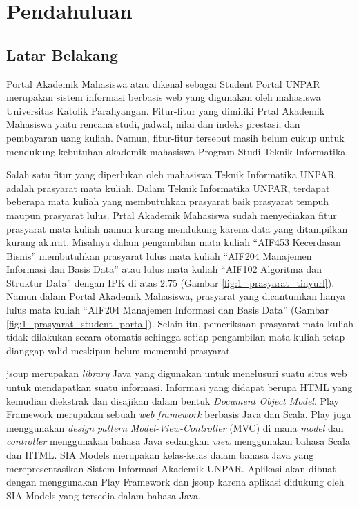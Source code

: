 \chapter{Pendahuluan}
\label{chap:pendahuluan}

\section{Latar Belakang}
\label{sec:latar_belakang}

Portal Akademik Mahasiswa atau dikenal sebagai Student Portal UNPAR\cite{studentportalunpar} merupakan sistem informasi berbasis web yang digunakan oleh mahasiswa Universitas Katolik Parahyangan. Fitur-fitur yang dimiliki Prtal Akademik Mahasiswa yaitu rencana studi, jadwal, nilai dan indeks prestasi, dan pembayaran uang kuliah. Namun, fitur-fitur tersebut masih belum cukup untuk mendukung kebutuhan akademik mahasiswa Program Studi Teknik Informatika. 

Salah satu fitur yang diperlukan oleh mahasiswa Teknik Informatika UNPAR adalah prasyarat mata kuliah. Dalam Teknik Informatika UNPAR, terdapat beberapa mata kuliah yang membutuhkan prasyarat baik prasyarat tempuh maupun prasyarat lulus. Prtal Akademik Mahasiswa sudah menyediakan fitur prasyarat mata kuliah namun kurang mendukung karena data yang ditampilkan kurang akurat. Misalnya dalam pengambilan mata kuliah ``AIF453 Kecerdasan Bisnis'' membutuhkan prasyarat lulus mata kuliah ``AIF204 Manajemen Informasi dan Basis Data'' atau lulus mata kuliah ``AIF102 Algoritma dan Struktur Data'' dengan IPK di atas 2.75 (Gambar \ref{fig:1_prasyarat_tinyurl}). Namun dalam Portal Akademik Mahasiswa, prasyarat yang dicantumkan hanya lulus mata kuliah ``AIF204 Manajemen Informasi dan Basis Data'' (Gambar \ref{fig:1_prasyarat_student_portal}). Selain itu, pemeriksaan prasyarat mata kuliah tidak dilakukan secara otomatis sehingga setiap pengambilan mata kuliah tetap dianggap valid meskipun belum memenuhi prasyarat.

jsoup\cite{jsoup} merupakan \textit{library} Java yang digunakan untuk menelusuri suatu situs web untuk mendapatkan suatu informasi. Informasi yang didapat berupa HTML yang kemudian diekstrak dan disajikan dalam bentuk \textit{Document Object Model}. Play Framework\cite{Leroux:2014} merupakan sebuah \textit{web framework} berbasis Java dan Scala. Play juga menggunakan \textit{design pattern} \textit{Model-View-Controller} (MVC) di mana \textit{model} dan \textit{controller} menggunakan bahasa Java sedangkan \textit{view} menggunakan bahasa Scala dan HTML. SIA Models\cite{siamodels} merupakan kelas-kelas dalam bahasa Java yang merepresentasikan Sistem Informasi Akademik UNPAR. Aplikasi akan dibuat dengan menggunakan Play Framework dan jsoup karena aplikasi didukung oleh SIA Models yang tersedia dalam bahasa Java. 

